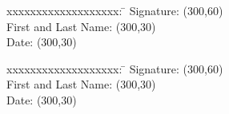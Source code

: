 { \Large \sigformconsult\par}
\begin{tabbing}
	xxxxxxxxxxxxxxxxxxx:          \= \kill  %
	Signature:                    \> \framebox(300,60){}
	{\mbox{}} \\
	First and Last Name:          \> \framebox(300,30){}
	{\mbox{}} \\
	Date:                         \> \framebox(300,30){}
	{\mbox{}} \\
\end{tabbing}
{ \Large \sigformclient\par}
\begin{tabbing}
	xxxxxxxxxxxxxxxxxxx:          \= \kill  %
	Signature:                    \> \framebox(300,60){}
	{\mbox{}} \\                                         
	First and Last Name:          \> \framebox(300,30){}
	{\mbox{}} \\                                         
	Date:                         \> \framebox(300,30){}
	{\mbox{}} \\
\end{tabbing}
